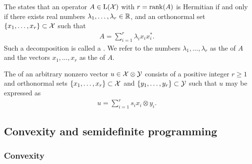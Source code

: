 The  states that an operator $A \in \mathrm{L}(\mathcal{X})$ with $r = \operatorname{rank}(A)$ is Hermitian if and only if there exists real numbers $\lambda_1, \ldots, \lambda_r \in \mathbb{R}$, and an orthonormal set $\{x_1, \ldots, x_r \} \subset \mathcal{X}$ such that 
\begin{align}
	A = \sum_{i=1}^r \lambda_i x_i x_i^*.
\end{align}
Such a decomposition is called a . We refer to the numbers $\lambda_1, \ldots, \lambda_r$ as the  of $A$ and the vectors $x_1, \ldots, x_r$ as the  of $A$.   
 
The  of an arbitrary nonzero vector $u \in \mathcal{X} \otimes \mathcal{Y}$ consists of a positive integer $r \geq 1$ and orthonormal sets $\{x_1, \ldots, x_r\} \subset \mathcal{X}$ and $\{y_1, \ldots, y_r \} \subset \mathcal{Y}$ such that $u$ may be expressed as 
\begin{align}
	u = \sum_{i=1}^r s_i x_i \otimes y_i.
\end{align}

\subsection{Convexity and semidefinite programming}

\subsubsection*{Convexity}

